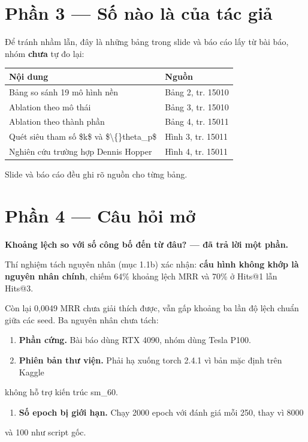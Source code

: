 \documentclass[11pt,a4paper]{article}
\begin{document}
\section{Phần 3 --- Số nào là của tác giả}
Để tránh nhầm lẫn, đây là những bảng trong slide và báo cáo lấy từ bài báo, nhóm \textbf{chưa} tự đo lại:

\begin{center}\small
\begin{tabular}{@{}ll@{}}
\toprule
\textbf{Nội dung} & \textbf{Nguồn}\\
\midrule
Bảng so sánh 19 mô hình nền & Bảng 2, tr. 15010\\
Ablation theo mô thái & Bảng 3, tr. 15010\\
Ablation theo thành phần & Bảng 4, tr. 15011\\
Quét siêu tham số \$k\$ và \$\textbackslash\{\}theta\_p\$ & Hình 3, tr. 15011\\
Nghiên cứu trường hợp Dennis Hopper & Hình 4, tr. 15011\\
\bottomrule
\end{tabular}
\end{center}
Slide và báo cáo đều ghi rõ nguồn cho từng bảng.

\section{Phần 4 --- Câu hỏi mở}
\textbf{Khoảng lệch so với số công bố đến từ đâu? --- đã trả lời một phần.}

Thí nghiệm tách nguyên nhân (mục 1.1b) xác nhận: \textbf{cấu hình không khớp là nguyên nhân chính}, chiếm 64\% khoảng lệch MRR và 70\% ở Hits@1 lẫn Hits@3.

Còn lại 0,0049 MRR chưa giải thích được, vẫn gấp khoảng ba lần độ lệch chuẩn giữa các seed. Ba nguyên nhân chưa tách:

\begin{enumerate}\itemsep2pt
\item \textbf{Phần cứng.} Bài báo dùng RTX 4090, nhóm dùng Tesla P100.
\item \textbf{Phiên bản thư viện.} Phải hạ xuống torch 2.4.1 vì bản mặc định trên Kaggle
\end{enumerate}
không hỗ trợ kiến trúc sm\_60.

\begin{enumerate}\itemsep2pt
\item \textbf{Số epoch bị giới hạn.} Chạy 2000 epoch với đánh giá mỗi 250, thay vì 8000
\end{enumerate}
và 100 như script gốc.
\end{document}
